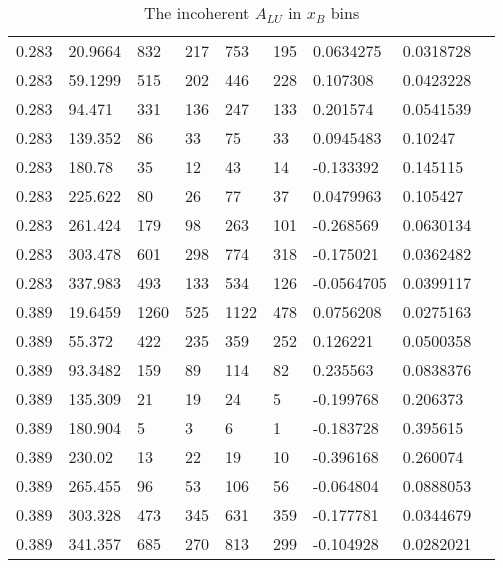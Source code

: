 \documentclass[12pt]{article}
\begin{document}
\begin{table}[!h]
\begin{center}
\begin{tabular}{||l|l|l|l|l|l|l|l|l||}
\hline
0.283    &20.9664    &832    &217   &753   &195    &0.0634275    &0.0318728\\
0.283    &59.1299    &515    &202   &446   &228    &0.107308    &0.0423228\\
0.283    &94.471    &331    &136   &247   &133    &0.201574    &0.0541539\\
0.283    &139.352    &86    &33   &75   &33    &0.0945483    &0.10247\\
0.283    &180.78     &35    &12   &43   &14    &-0.133392    &0.145115\\
0.283    &225.622     &80    &26   &77   &37    &0.0479963    &0.105427\\
0.283    &261.424     &179    &98   &263   &101    &-0.268569    &0.0630134\\
0.283    &303.478     &601    &298   &774   &318    &-0.175021    &0.0362482\\
0.283    &337.983     &493    &133   &534   &126    &-0.0564705    &0.0399117\\
\hline
0.389    &19.6459    &1260    &525   &1122   &478    &0.0756208    &0.0275163\\
0.389    &55.372     &422    &235   &359   &252    &0.126221    &0.0500358\\
0.389    &93.3482     &159    &89   &114   &82    &0.235563    &0.0838376\\
0.389    &135.309     &21    &19   &24   &5    &-0.199768    &0.206373\\
0.389    &180.904     &5    &3   &6   &1    &-0.183728    &0.395615\\
0.389    &230.02     &13    &22   &19   &10    &-0.396168    &0.260074\\
0.389    &265.455      &96    &53   &106   &56    &-0.064804    &0.0888053\\
0.389    &303.328       &473    &345   &631   &359    &-0.177781    &0.0344679\\
0.389    &341.357      &685    &270   &813   &299    &-0.104928    &0.0282021\\       
         
         
         \hline
 \hline
 \end{tabular}
 \caption{The incoherent $A_{LU}$ in $x_B$ bins}
 \label{table:InCoh_xB_BSA}
 \end{center}
\end{table}
\end{document}
